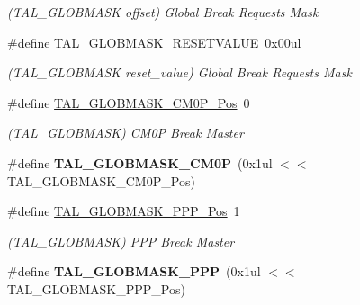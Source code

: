 \begin{DoxyCompactItemize}
\begin{DoxyCompactList}\small\item\em (T\+A\+L\+\_\+\+G\+L\+O\+B\+M\+A\+S\+K offset) Global Break Requests Mask \end{DoxyCompactList}\item 
\hypertarget{group___s_a_m_l21___t_a_l_ga31e8b3ab5e348072a6018ed1945a8a01}{}\#define \hyperlink{group___s_a_m_l21___t_a_l_ga31e8b3ab5e348072a6018ed1945a8a01}{T\+A\+L\+\_\+\+G\+L\+O\+B\+M\+A\+S\+K\+\_\+\+R\+E\+S\+E\+T\+V\+A\+L\+U\+E}~0x00ul\label{group___s_a_m_l21___t_a_l_ga31e8b3ab5e348072a6018ed1945a8a01}

\begin{DoxyCompactList}\small\item\em (T\+A\+L\+\_\+\+G\+L\+O\+B\+M\+A\+S\+K reset\+\_\+value) Global Break Requests Mask \end{DoxyCompactList}\item 
\hypertarget{group___s_a_m_l21___t_a_l_ga88d0a36ad079f7f96a8a28005550857e}{}\#define \hyperlink{group___s_a_m_l21___t_a_l_ga88d0a36ad079f7f96a8a28005550857e}{T\+A\+L\+\_\+\+G\+L\+O\+B\+M\+A\+S\+K\+\_\+\+C\+M0\+P\+\_\+\+Pos}~0\label{group___s_a_m_l21___t_a_l_ga88d0a36ad079f7f96a8a28005550857e}

\begin{DoxyCompactList}\small\item\em (T\+A\+L\+\_\+\+G\+L\+O\+B\+M\+A\+S\+K) C\+M0\+P Break Master \end{DoxyCompactList}\item 
\hypertarget{group___s_a_m_l21___t_a_l_gaf40d5e9883ff5b09ea01cfabf16f03e9}{}\#define {\bfseries T\+A\+L\+\_\+\+G\+L\+O\+B\+M\+A\+S\+K\+\_\+\+C\+M0\+P}~(0x1ul $<$$<$ T\+A\+L\+\_\+\+G\+L\+O\+B\+M\+A\+S\+K\+\_\+\+C\+M0\+P\+\_\+\+Pos)\label{group___s_a_m_l21___t_a_l_gaf40d5e9883ff5b09ea01cfabf16f03e9}

\item 
\hypertarget{group___s_a_m_l21___t_a_l_ga61140f0a5de923f9b79719f34524ff7d}{}\#define \hyperlink{group___s_a_m_l21___t_a_l_ga61140f0a5de923f9b79719f34524ff7d}{T\+A\+L\+\_\+\+G\+L\+O\+B\+M\+A\+S\+K\+\_\+\+P\+P\+P\+\_\+\+Pos}~1\label{group___s_a_m_l21___t_a_l_ga61140f0a5de923f9b79719f34524ff7d}

\begin{DoxyCompactList}\small\item\em (T\+A\+L\+\_\+\+G\+L\+O\+B\+M\+A\+S\+K) P\+P\+P Break Master \end{DoxyCompactList}\item 
\hypertarget{group___s_a_m_l21___t_a_l_ga94d43ea9f42bc8216a0618b3ccddb4c0}{}\#define {\bfseries T\+A\+L\+\_\+\+G\+L\+O\+B\+M\+A\+S\+K\+\_\+\+P\+P\+P}~(0x1ul $<$$<$ T\+A\+L\+\_\+\+G\+L\+O\+B\+M\+A\+S\+K\+\_\+\+P\+P\+P\+\_\+\+Pos)\label{group___s_a_m_l21___t_a_l_ga94d43ea9f42bc8216a0618b3ccddb4c0}


\end{DoxyCompactItemize}
